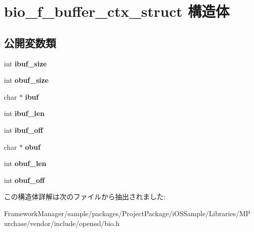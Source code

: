 \hypertarget{structbio__f__buffer__ctx__struct}{}\section{bio\+\_\+f\+\_\+buffer\+\_\+ctx\+\_\+struct 構造体}
\label{structbio__f__buffer__ctx__struct}
\subsection*{公開変数類}
\begin{DoxyCompactItemize}
\item 
\hypertarget{structbio__f__buffer__ctx__struct_a2ef352eaf33c4d0414c494054d43a795}{}int {\bfseries ibuf\+\_\+size}\label{structbio__f__buffer__ctx__struct_a2ef352eaf33c4d0414c494054d43a795}

\item 
\hypertarget{structbio__f__buffer__ctx__struct_ac054193e554cf659d638b00484ba3b07}{}int {\bfseries obuf\+\_\+size}\label{structbio__f__buffer__ctx__struct_ac054193e554cf659d638b00484ba3b07}

\item 
\hypertarget{structbio__f__buffer__ctx__struct_a7d1c4d9f2365e5f41ae5dc3abef7a489}{}char $\ast$ {\bfseries ibuf}\label{structbio__f__buffer__ctx__struct_a7d1c4d9f2365e5f41ae5dc3abef7a489}

\item 
\hypertarget{structbio__f__buffer__ctx__struct_aeac265d0eb617edf027d714cb22bee72}{}int {\bfseries ibuf\+\_\+len}\label{structbio__f__buffer__ctx__struct_aeac265d0eb617edf027d714cb22bee72}

\item 
\hypertarget{structbio__f__buffer__ctx__struct_a4a05bfddcb84c53b98df8cf72d7626a0}{}int {\bfseries ibuf\+\_\+off}\label{structbio__f__buffer__ctx__struct_a4a05bfddcb84c53b98df8cf72d7626a0}

\item 
\hypertarget{structbio__f__buffer__ctx__struct_a3b756daa7e6784f12e178c2f73b6cbe4}{}char $\ast$ {\bfseries obuf}\label{structbio__f__buffer__ctx__struct_a3b756daa7e6784f12e178c2f73b6cbe4}

\item 
\hypertarget{structbio__f__buffer__ctx__struct_aa405c5c91239978aeabda2f9537db899}{}int {\bfseries obuf\+\_\+len}\label{structbio__f__buffer__ctx__struct_aa405c5c91239978aeabda2f9537db899}

\item 
\hypertarget{structbio__f__buffer__ctx__struct_a33d8e302dcb91873af9ed993094e1960}{}int {\bfseries obuf\+\_\+off}\label{structbio__f__buffer__ctx__struct_a33d8e302dcb91873af9ed993094e1960}

\end{DoxyCompactItemize}


この構造体詳解は次のファイルから抽出されました\+:\begin{DoxyCompactItemize}
\item 
Framework\+Manager/sample/packages/\+Project\+Package/i\+O\+S\+Sample/\+Libraries/\+M\+Purchase/vendor/include/openssl/bio.\+h\end{DoxyCompactItemize}
